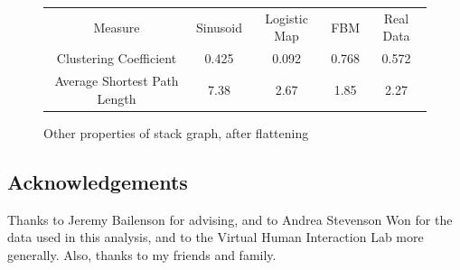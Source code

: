 \documentclass[12pt]{article}
\begin{document}
\begin{figure}\label{fig:stack_ts_others}
  \begin{tabular} {c || c c c c}
    Measure & Sinusoid & Logistic Map & FBM & Real Data \\
    Clustering Coefficient & 0.425 & 0.092 & 0.768 & 0.572 \\
    Average Shortest Path Length & 7.38 & 2.67 & 1.85 & 2.27 \\
  \end{tabular}
  \caption{Other properties of stack graph, after flattening}
\end{figure}

\subsection{Acknowledgements}

Thanks to Jeremy Bailenson for advising, and to Andrea Stevenson Won for the data used in this analysis, and to the Virtual Human Interaction Lab more generally. Also, thanks to my friends and family.
\end{document}

